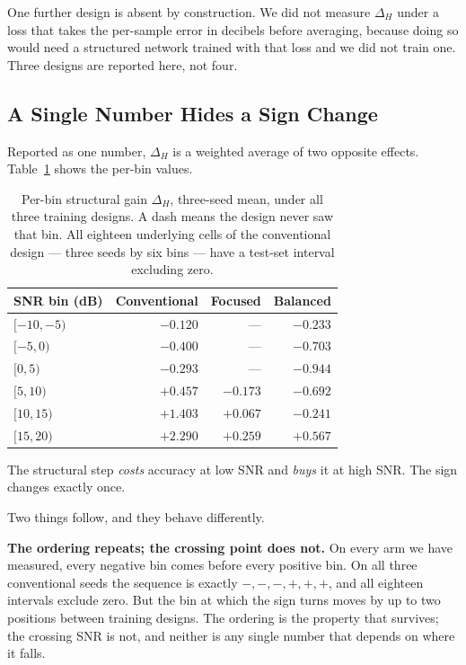 \documentclass[journal]{IEEEtran}
\begin{document}
One further design is absent by construction. We did not measure $\Delta_H$
under a loss that takes the per-sample error in decibels before averaging,
because doing so would need a structured network trained with that loss and we
did not train one. Three designs are reported here, not four.

\subsection{A Single Number Hides a Sign Change}

Reported as one number, $\Delta_H$ is a weighted average of two opposite
effects. Table~\ref{tab:signs} shows the per-bin values.

\begin{table}[!t]
\caption{Per-bin structural gain $\Delta_H$, three-seed mean, under all three
training designs. A dash means the design never saw that bin. All eighteen
underlying cells of the conventional design --- three seeds by six bins --- have
a test-set interval excluding zero.}
\label{tab:signs}
\centering
\footnotesize
\begin{tabular}{lrrr}
\toprule
SNR bin (dB) & Conventional & Focused & Balanced \\
\midrule
$[-10,-5)$ & $-0.120$ & --- & $-0.233$ \\
$[-5,0)$ & $-0.400$ & --- & $-0.703$ \\
$[0,5)$ & $-0.293$ & --- & $-0.944$ \\
$[5,10)$ & $+0.457$ & $-0.173$ & $-0.692$ \\
$[10,15)$ & $+1.403$ & $+0.067$ & $-0.241$ \\
$[15,20)$ & $+2.290$ & $+0.259$ & $+0.567$ \\
\bottomrule
\end{tabular}
\end{table}

The structural step \emph{costs} accuracy at low SNR and \emph{buys} it at high
SNR. The sign changes exactly once.

Two things follow, and they behave differently.

\textbf{The ordering repeats; the crossing point does not.} On every arm we
have measured, every negative bin comes before every positive bin. On all three
conventional seeds the sequence is exactly $-,-,-,+,+,+$, and all eighteen
intervals exclude zero. But the bin at which the sign turns moves by up to two
positions between training designs. The ordering is the property that survives;
the crossing SNR is not, and neither is any single number that depends on where
it falls.
\end{document}
